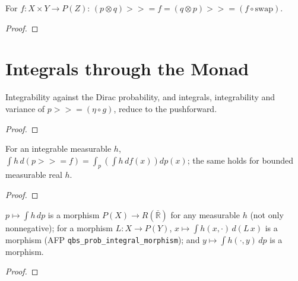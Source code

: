 \begin{corollary}\label{cor:qbs_bind_comm}
  \rocqok
  For $f : X \times Y \to P(Z)$:
  $(p \otimes q) \mathbin{>\!\!>\!\!=} f =
  (q \otimes p) \mathbin{>\!\!>\!\!=} (f \circ \mathrm{swap})$.
\end{corollary}
\begin{proof}\rocqok\end{proof}


\section{Integrals through the Monad}\label{sec:monad_integral}

\begin{lemma}\label{lem:qbs_integrable_return}
  \rocqok
  Integrability against the Dirac probability, and integrals, integrability and variance of $p \mathbin{>\!\!>\!\!=} (\eta \circ g)$, reduce to the pushforward.
\end{lemma}
\begin{proof}\rocqok\end{proof}

\begin{theorem}\label{thm:qbs_integral_bind}
  \rocqok
  For an integrable measurable $h$, $\int h \, d(p \mathbin{>\!\!>\!\!=} f) = \int_p \left(\int h \, d f(x)\right) dp(x)$; the same holds for bounded measurable real $h$.
\end{theorem}
\begin{proof}\rocqok\end{proof}

\begin{lemma}\label{lem:qbs_morphism_integral}
  \rocqok
  $p \mapsto \int h \, dp$ is a morphism $P(X) \to R(\bar{\mathbb{R}})$ for any measurable $h$ (not only nonnegative); for a morphism $L : X \to P(Y)$, $x \mapsto \int h(x, \cdot)\, d(L\,x)$ is a morphism (AFP \texttt{qbs\_prob\_integral\_morphism}); and $y \mapsto \int h(\cdot, y)\, dp$ is a morphism.
\end{lemma}
\begin{proof}\rocqok\end{proof}



